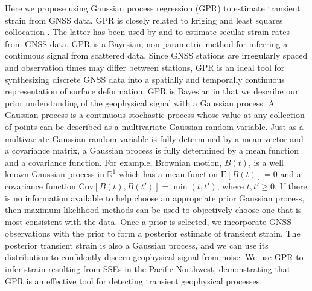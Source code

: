 \documentclass[extra,mreferee]{gji}
\begin{document}
Here we propose using Gaussian process regression (GPR) \citep{Rasmussen2006} to estimate transient strain from GNSS data. GPR is closely related to kriging \citep{Cressie1992} and least squares collocation \citep{Moritz1978}. The latter has been used by \citet{Kato1998} and \citet{El-Fiky1999} to estimate secular strain rates from GNSS data. GPR is a Bayesian, non-parametric method for inferring a continuous signal from scattered data. Since GNSS stations are irregularly spaced and observation times may differ between stations, GPR is an ideal tool for synthesizing discrete GNSS data into a spatially and temporally continuous representation of surface deformation. GPR is Bayesian in that we describe our prior understanding of the geophysical signal with a Gaussian process. A Gaussian process is a continuous stochastic process whose value at any collection of points can be described as a multivariate Gaussian random variable. Just as a multivariate Gaussian random variable is fully determined by a mean vector and a covariance matrix, a Gaussian process is fully determined by a mean function and a covariance function. For example, Brownian motion, $B(t)$, is a well known Gaussian process in $\mathbb{R}^1$ which has a mean function $\mathrm{E}[B(t)] = 0$ and a covariance function $\mathrm{Cov}\left[B(t),B(t')\right] = \min(t,t')$, where $t,t' \ge 0$. If there is no information available to help choose an appropriate prior Gaussian process, then maximum likelihood methods can be used to objectively choose one that is most consistent with the data. Once a prior is selected, we incorporate GNSS observations with the prior to form a posterior estimate of transient strain. The posterior transient strain is also a Gaussian process, and we can use its distribution to confidently discern geophysical signal from noise. We use GPR to infer strain resulting from SSEs in the Pacific Northwest, demonstrating that GPR is an effective tool for detecting transient geophysical processes. 
\end{document}

